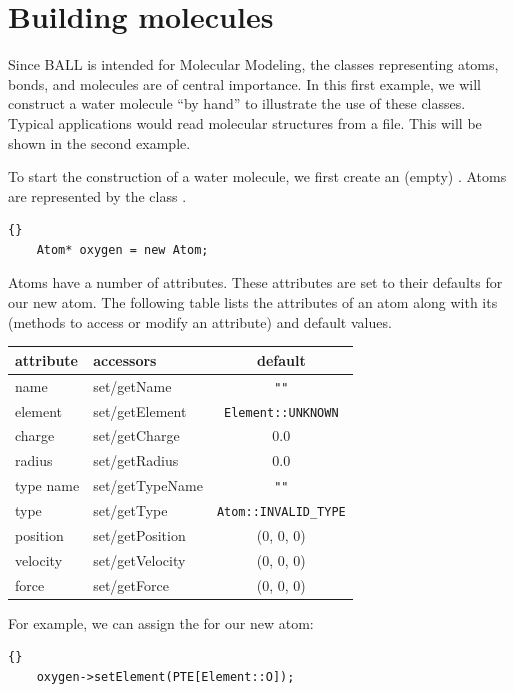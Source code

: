 \section{Building molecules}

Since BALL is intended for Molecular Modeling, the classes representing atoms,
bonds, and molecules are of central importance. In this first example, we will
construct a water molecule ``by hand'' to illustrate the use of these classes.
Typical applications would read molecular structures from a file. This will be
shown in the second example.

\noindent
To start the construction of a water molecule, we first create an (empty)
. Atoms are represented by the class .

\begin{lstlisting}{}
	Atom* oxygen = new Atom;
\end{lstlisting}
	
\noindent
Atoms have a number of attributes. These attributes are set to their defaults
for our new atom. The following table lists the attributes of an atom along
with its  (methods to access or modify an attribute) and
default values.
\begin{center}
	\begin{tabular}{llc}
	attribute		&	accessors     		& default\\
	\hline
	name				& set/getName				& {\tt ""}\\
	element			& set/getElement    & {\tt Element::UNKNOWN}\\
	charge			& set/getCharge			& 0.0\\
	radius			& set/getRadius			& 0.0\\
	type name   & set/getTypeName   & {\tt ""}\\
	type        & set/getType       & {\tt Atom::INVALID\_TYPE}\\
	position    & set/getPosition   & (0, 0, 0)\\
	velocity    & set/getVelocity   & (0, 0, 0)\\
	force		    & set/getForce		  & (0, 0, 0)
	\end{tabular}
\end{center}

\noindent
For example, we can assign the  for our new atom:

\begin{lstlisting}{}
	oxygen->setElement(PTE[Element::O]);
\end{lstlisting}


